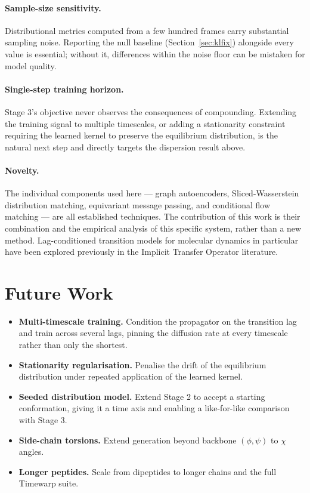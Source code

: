 \documentclass[11pt,a4paper]{article}
\newcommand{\phipsi}{$(\phi,\psi)$}
\begin{document}
\paragraph{Sample-size sensitivity.} Distributional metrics computed from a few
hundred frames carry substantial sampling noise. Reporting the null baseline
(Section~\ref{sec:klfix}) alongside every value is essential; without it,
differences within the noise floor can be mistaken for model quality.

\paragraph{Single-step training horizon.} Stage 3's objective never observes
the consequences of compounding. Extending the training signal to multiple
timescales, or adding a stationarity constraint requiring the learned kernel to
preserve the equilibrium distribution, is the natural next step and directly
targets the dispersion result above.

\paragraph{Novelty.} The individual components used here --- graph
autoencoders, Sliced-Wasserstein distribution matching, equivariant message
passing, and conditional flow matching --- are all established techniques. The
contribution of this work is their combination and the empirical analysis of
this specific system, rather than a new method. Lag-conditioned transition
models for molecular dynamics in particular have been explored previously in
the Implicit Transfer Operator literature.

\section{Future Work}

\begin{itemize}
\item \textbf{Multi-timescale training.} Condition the propagator on the
transition lag and train across several lags, pinning the diffusion rate at
every timescale rather than only the shortest.
\item \textbf{Stationarity regularisation.} Penalise the drift of the
equilibrium distribution under repeated application of the learned kernel.
\item \textbf{Seeded distribution model.} Extend Stage 2 to accept a starting
conformation, giving it a time axis and enabling a like-for-like comparison
with Stage 3.
\item \textbf{Side-chain torsions.} Extend generation beyond backbone
\phipsi{} to $\chi$ angles.
\item \textbf{Longer peptides.} Scale from dipeptides to longer chains and the
full Timewarp suite.
\end{itemize}
\end{document}
